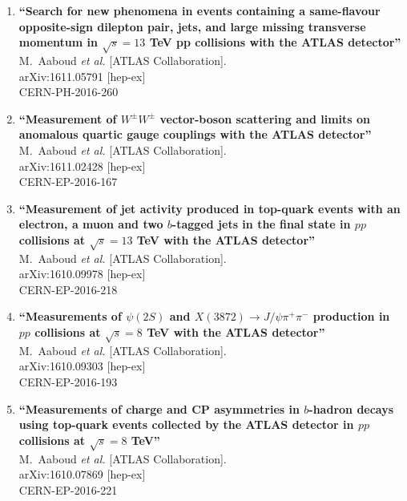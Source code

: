 \documentclass{article}
\begin{document}
\begin{enumerate}
\item%
{\bf ``Search for new phenomena in events containing a same-flavour opposite-sign dilepton pair, jets, and large missing transverse momentum in $\sqrt{s}=13$ TeV pp collisions with the ATLAS detector''}
  \\{}M.~Aaboud {\it et al.} [ATLAS Collaboration].
  \\{}arXiv:1611.05791 [hep-ex]
  \\{}CERN-PH-2016-260

\item%
{\bf ``Measurement of $W^{\pm}W^{\pm}$ vector-boson scattering and limits on anomalous quartic gauge couplings with the ATLAS detector''}
  \\{}M.~Aaboud {\it et al.} [ATLAS Collaboration].
  \\{}arXiv:1611.02428 [hep-ex]
  \\{}CERN-EP-2016-167
\item%
{\bf ``Measurement of jet activity produced in top-quark events with an electron, a muon and two $b$-tagged jets in the final state in $pp$ collisions at $\sqrt{s}=13$ TeV with the ATLAS detector''}
  \\{}M.~Aaboud {\it et al.} [ATLAS Collaboration].
  \\{}arXiv:1610.09978 [hep-ex]
  \\{}CERN-EP-2016-218
\item%
{\bf ``Measurements of $\psi(2S)$ and $X(3872) \to J/\psi\pi^+\pi^-$ production in $pp$ collisions at $\sqrt{s} = 8$ TeV with the ATLAS detector''}
  \\{}M.~Aaboud {\it et al.} [ATLAS Collaboration].
  \\{}arXiv:1610.09303 [hep-ex]
  \\{}CERN-EP-2016-193
\item%
{\bf ``Measurements of charge and CP asymmetries in $b$-hadron decays using top-quark events collected by the ATLAS detector in $pp$ collisions at $\sqrt{s}=8$ TeV''}
  \\{}M.~Aaboud {\it et al.} [ATLAS Collaboration].
  \\{}arXiv:1610.07869 [hep-ex]
  \\{}CERN-EP-2016-221


\end{enumerate}
\end{document}
